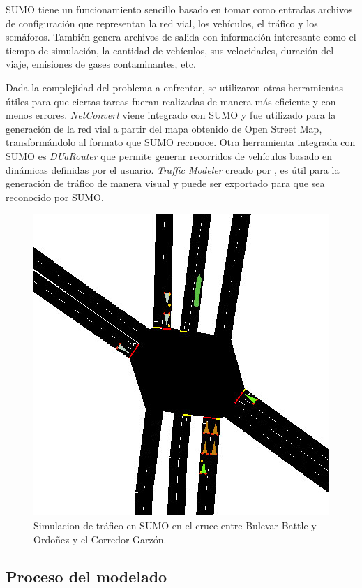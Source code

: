 SUMO tiene un funcionamiento sencillo basado en tomar como entradas archivos de configuración que representan la red vial, los vehículos, el tráfico y los semáforos. También genera archivos de salida con información interesante como el tiempo de simulación, la cantidad de vehículos, sus velocidades, duración del viaje, emisiones de gases contaminantes, etc. 

Dada la complejidad del problema a enfrentar, se utilizaron otras herramientas útiles para que ciertas tareas fueran realizadas de manera más eficiente y con menos errores. \emph{NetConvert} viene integrado con SUMO y fue utilizado para la generación de la red vial a partir del mapa obtenido de Open Street Map, transformándolo al formato que SUMO reconoce. Otra herramienta integrada con SUMO es \emph{DUaRouter} que permite generar recorridos de vehículos basado en dinámicas definidas por el usuario. \emph{Traffic Modeler} creado por \citet{TrafficModeler}, es útil para la generación de tráfico de manera visual y puede ser exportado para que sea reconocido por SUMO. 
	


\begin{figure}[H]
	\centering
	\includegraphics[width=0.7\linewidth]{Figures/sim1}
	\caption{Simulacion de tráfico en SUMO en el cruce entre Bulevar Battle y Ordoñez y el Corredor Garzón.}
	\label{fig:sim1}
\end{figure}



\subsection{Proceso del modelado}

